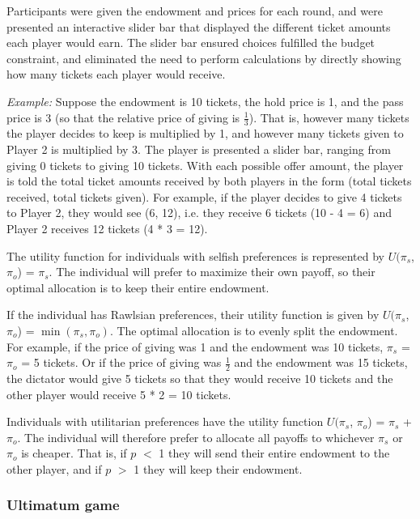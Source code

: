 \documentclass[12pt]{article}
\begin{document}
Participants were given the endowment and prices for each round, and were presented an interactive slider bar that displayed the different ticket amounts each player would earn. The slider bar ensured choices fulfilled the budget constraint, and eliminated the need to perform calculations by directly showing how many tickets each player would receive.

\textit{Example:} Suppose the endowment is 10 tickets, the hold price is 1, and the pass price is 3 (so that the relative price of giving is \(\frac{1}{3}\)). That is, however many tickets the player decides to keep is multiplied by 1, and however many tickets given to Player 2 is multiplied by 3. The player is presented a slider bar, ranging from giving 0 tickets to giving 10 tickets. With each possible offer amount, the player is told the total ticket amounts received by both players in the form (total tickets received, total tickets given). For example, if the player decides to give 4 tickets to Player 2, they would see (6, 12), i.e. they receive 6 tickets (10 - 4 = 6) and Player 2 receives 12 tickets (4 * 3 = 12).

The utility function for individuals with selfish preferences is represented by \(U(\pi_{s}\), \(\pi_{o}\)) = \(\pi_{s}\). The individual will prefer to maximize their own payoff, so their optimal allocation is to keep their entire endowment.

If the individual has Rawlsian preferences, their utility function is given by \(U(\pi_{s}\), \(\pi_{o}\)) = \(\min(\pi_{s}, \pi_{o})\). The optimal allocation is to evenly split the endowment. For example, if the price of giving was 1 and the endowment was 10 tickets, \(\pi_{s}\) = \(\pi_{o}\) = 5 tickets. Or if the price of giving was \(\frac{1}{2}\) and the endowment was 15 tickets, the dictator would give 5 tickets so that they would receive 10 tickets and the other player would receive 5 * 2 = 10 tickets. 

Individuals with utilitarian preferences have the utility function \(U(\pi_{s}\), \(\pi_{o}\)) = \(\pi_{s}\) + \(\pi_{o}\). The individual will therefore prefer to allocate all payoffs to whichever \(\pi_{s}\) or \(\pi_{o}\) is cheaper. That is, if \(p\) $<$ 1 they will send their entire endowment to the other player, and if \(p\) $>$ 1 they will keep their endowment.


\subsubsection{Ultimatum game}
\end{document}
